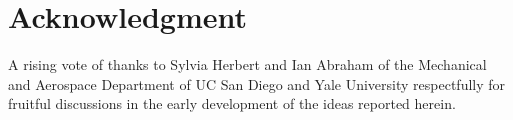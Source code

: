 \section{Acknowledgment}
A rising vote of thanks to Sylvia Herbert and Ian Abraham of the Mechanical and Aerospace Department of UC San Diego and Yale University respectfully for fruitful discussions in the early development of the ideas reported herein.